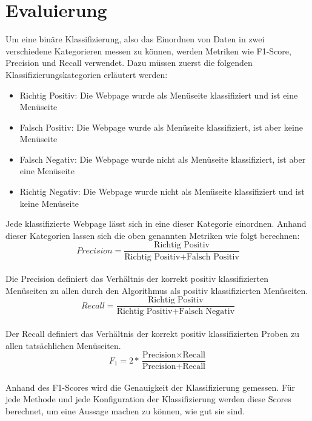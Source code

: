 \section{Evaluierung}
Um eine binäre Klassifizierung, also das Einordnen von Daten in zwei verschiedene Kategorieren messen zu können, werden Metriken wie F1-Score, Precision und Recall verwendet.
Dazu müssen zuerst die folgenden Klassifizierungskategorien erläutert werden:
\begin{itemize}
	\item Richtig Positiv: Die Webpage wurde als Menüseite klassifiziert und ist eine Menüseite
	\item Falsch Positiv: Die Webpage wurde als Menüseite klassifiziert, ist aber keine Menüseite
	\item Falsch Negativ: Die Webpage wurde nicht als Menüseite klassifiziert, ist aber eine Menüseite
	\item Richtig Negativ: Die Webpage wurde nicht als Menüseite klassifiziert und ist keine Menüseite
\end{itemize}
Jede klassifizierte Webpage lässt sich in eine dieser Kategorie einordnen.
Anhand dieser Kategorien lassen sich die oben genannten Metriken wie folgt berechnen:\\
\[Precision=\frac{\text{Richtig Positiv}}{\text{Richtig Positiv} + \text{Falsch Positiv}}\]\\
Die Precision definiert das Verhältnis der korrekt positiv klassifizierten Menüseiten zu allen durch den Algorithmus als positiv klassifizierten Menüseiten.\\
\[Recall=\frac{\text{Richtig Positiv}}{\text{Richtig Positiv} + \text{Falsch Negativ}}\]\\
Der Recall definiert das Verhältnis der korrekt positiv klassifizierten Proben zu allen tatsächlichen Menüseiten.\\
\[F_{1}=2*\frac{\text{Precision} \times \text{Recall}}{\text{Precision} + \text{Recall}}\]\\
Anhand des F1-Scores wird die Genauigkeit der Klassifizierung gemessen.
Für jede Methode und jede Konfiguration der Klassifizierung werden diese Scores berechnet, um eine Aussage machen zu können, wie gut sie sind.

